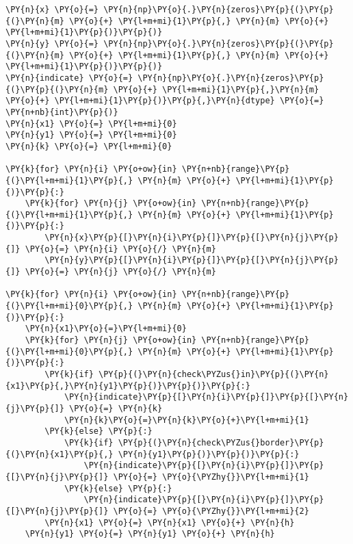     \begin{tcolorbox}[breakable, size=fbox, boxrule=1pt, pad at break*=1mm,colback=cellbackground, colframe=cellborder]
\begin{Verbatim}[commandchars=\\\{\}]
\PY{n}{x} \PY{o}{=} \PY{n}{np}\PY{o}{.}\PY{n}{zeros}\PY{p}{(}\PY{p}{(}\PY{n}{m} \PY{o}{+} \PY{l+m+mi}{1}\PY{p}{,} \PY{n}{m} \PY{o}{+} \PY{l+m+mi}{1}\PY{p}{)}\PY{p}{)}
\PY{n}{y} \PY{o}{=} \PY{n}{np}\PY{o}{.}\PY{n}{zeros}\PY{p}{(}\PY{p}{(}\PY{n}{m} \PY{o}{+} \PY{l+m+mi}{1}\PY{p}{,} \PY{n}{m} \PY{o}{+} \PY{l+m+mi}{1}\PY{p}{)}\PY{p}{)}
\PY{n}{indicate} \PY{o}{=} \PY{n}{np}\PY{o}{.}\PY{n}{zeros}\PY{p}{(}\PY{p}{(}\PY{n}{m} \PY{o}{+} \PY{l+m+mi}{1}\PY{p}{,}\PY{n}{m} \PY{o}{+} \PY{l+m+mi}{1}\PY{p}{)}\PY{p}{,}\PY{n}{dtype} \PY{o}{=} \PY{n+nb}{int}\PY{p}{)}
\PY{n}{x1} \PY{o}{=} \PY{l+m+mi}{0}
\PY{n}{y1} \PY{o}{=} \PY{l+m+mi}{0}
\PY{n}{k} \PY{o}{=} \PY{l+m+mi}{0}

\PY{k}{for} \PY{n}{i} \PY{o+ow}{in} \PY{n+nb}{range}\PY{p}{(}\PY{l+m+mi}{1}\PY{p}{,} \PY{n}{m} \PY{o}{+} \PY{l+m+mi}{1}\PY{p}{)}\PY{p}{:}
    \PY{k}{for} \PY{n}{j} \PY{o+ow}{in} \PY{n+nb}{range}\PY{p}{(}\PY{l+m+mi}{1}\PY{p}{,} \PY{n}{m} \PY{o}{+} \PY{l+m+mi}{1}\PY{p}{)}\PY{p}{:}
        \PY{n}{x}\PY{p}{[}\PY{n}{i}\PY{p}{]}\PY{p}{[}\PY{n}{j}\PY{p}{]} \PY{o}{=} \PY{n}{i} \PY{o}{/} \PY{n}{m}
        \PY{n}{y}\PY{p}{[}\PY{n}{i}\PY{p}{]}\PY{p}{[}\PY{n}{j}\PY{p}{]} \PY{o}{=} \PY{n}{j} \PY{o}{/} \PY{n}{m}
        
\PY{k}{for} \PY{n}{i} \PY{o+ow}{in} \PY{n+nb}{range}\PY{p}{(}\PY{l+m+mi}{0}\PY{p}{,} \PY{n}{m} \PY{o}{+} \PY{l+m+mi}{1}\PY{p}{)}\PY{p}{:}
    \PY{n}{x1}\PY{o}{=}\PY{l+m+mi}{0}
    \PY{k}{for} \PY{n}{j} \PY{o+ow}{in} \PY{n+nb}{range}\PY{p}{(}\PY{l+m+mi}{0}\PY{p}{,} \PY{n}{m} \PY{o}{+} \PY{l+m+mi}{1}\PY{p}{)}\PY{p}{:}
        \PY{k}{if} \PY{p}{(}\PY{n}{check\PYZus{}in}\PY{p}{(}\PY{n}{x1}\PY{p}{,}\PY{n}{y1}\PY{p}{)}\PY{p}{)}\PY{p}{:}
            \PY{n}{indicate}\PY{p}{[}\PY{n}{i}\PY{p}{]}\PY{p}{[}\PY{n}{j}\PY{p}{]} \PY{o}{=} \PY{n}{k}
            \PY{n}{k}\PY{o}{=}\PY{n}{k}\PY{o}{+}\PY{l+m+mi}{1}
        \PY{k}{else} \PY{p}{:}
            \PY{k}{if} \PY{p}{(}\PY{n}{check\PYZus{}border}\PY{p}{(}\PY{n}{x1}\PY{p}{,} \PY{n}{y1}\PY{p}{)}\PY{p}{)}\PY{p}{:}
                \PY{n}{indicate}\PY{p}{[}\PY{n}{i}\PY{p}{]}\PY{p}{[}\PY{n}{j}\PY{p}{]} \PY{o}{=} \PY{o}{\PYZhy{}}\PY{l+m+mi}{1}
            \PY{k}{else} \PY{p}{:}
                \PY{n}{indicate}\PY{p}{[}\PY{n}{i}\PY{p}{]}\PY{p}{[}\PY{n}{j}\PY{p}{]} \PY{o}{=} \PY{o}{\PYZhy{}}\PY{l+m+mi}{2}
        \PY{n}{x1} \PY{o}{=} \PY{n}{x1} \PY{o}{+} \PY{n}{h}           
    \PY{n}{y1} \PY{o}{=} \PY{n}{y1} \PY{o}{+} \PY{n}{h}
\end{Verbatim}
\end{tcolorbox}

